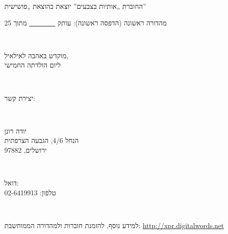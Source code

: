 \begin{center}
	החוברת „אותיות בצבעים” יוצאת בהוצאת „פושישית”


	מהדורה ראשונה (הדפסה ראשונה): עותק \underline{~ ~ ~ ~ ~} מתוך 25

	\vfill

	~

	\vfill

	\middlelinenormal

	מוקדש באהבה לאילאיל,\\
	ליום הולדתה החמישי

	\vfill

	~

	\vfill

	\middlelinenormal

	יצירת קשר:

	~

	יודה רונן\\
	הנחל 4/6, הגבעה הצרפתית\\
	ירושלים, 97882

	~

	דואל: \\
	טלפון: 02-6419913

	~

	למידע נוסף, להזמנת חוברות ולמהדורה הממוחשבת:
	\url{http://xpr.digitalwords.net}
\end{center}
